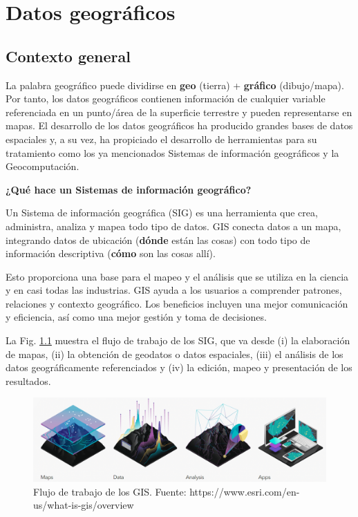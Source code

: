 \documentclass[
]{book}
\theoremstyle{definition}
\theoremstyle{definition}
\theoremstyle{definition}
\theoremstyle{definition}
\theoremstyle{remark}
\begin{document}
\hypertarget{datos-geogruxe1ficos}{%
\chapter{Datos geográficos}\label{datos-geogruxe1ficos}}

\hypertarget{contexto-general}{%
\section{Contexto general}\label{contexto-general}}

La palabra geográfico puede dividirse en \textbf{geo} (tierra) + \textbf{gráfico}
(dibujo/mapa). Por tanto, los datos geográficos contienen información de
cualquier variable referenciada en un punto/área de la superficie terrestre y
pueden representarse en mapas. El desarrollo de los datos geográficos ha
producido grandes bases de datos espaciales y, a su vez, ha propiciado el
desarrollo de herramientas para su tratamiento como los ya mencionados Sistemas
de información geográficos y la Geocomputación.

\textbf{¿Qué hace un Sistemas de información geográfico?}

Un Sistema de información geográfica (SIG) es una herramienta que crea,
administra, analiza y mapea todo tipo de datos. GIS conecta datos a un mapa,
integrando datos de ubicación (\textbf{dónde} están las cosas) con todo tipo de
información descriptiva (\textbf{cómo} son las cosas allí).

Esto proporciona una base para el mapeo y el análisis que se utiliza en la
ciencia y en casi todas las industrias. GIS ayuda a los usuarios a comprender
patrones, relaciones y contexto geográfico. Los beneficios incluyen una mejor
comunicación y eficiencia, así como una mejor gestión y toma de decisiones.

La Fig. \ref{fig:gisflujo} muestra el flujo de trabajo de los SIG, que va desde
(i) la elaboración de mapas, (ii) la obtención de geodatos o datos espaciales,
(iii) el análisis de los datos geográficamente referenciados y (iv) la edición,
mapeo y presentación de los resultados.

\begin{figure}

{\centering \includegraphics[width=0.7\linewidth]{img/GIS} 

}

\caption{Flujo de trabajo de los GIS. Fuente: https://www.esri.com/en-us/what-is-gis/overview}\label{fig:gisflujo}
\end{figure}
\end{document}
